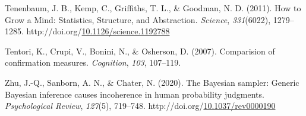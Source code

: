 \documentclass[10pt, letterpaper]{article}
\newenvironment{CSLReferences}%
  {}%
  {\par}
\begin{document}
\begin{CSLReferences}
\leavevmode{}%
Tenenbaum, J. B., Kemp, C., Griffiths, T. L., \& Goodman, N. D. (2011).
How to {Grow} a {Mind}: {Statistics}, {Structure}, and {Abstraction}.
\emph{Science}, \emph{331}(6022), 1279--1285.
http://doi.org/\href{https://doi.org/10.1126/science.1192788}{10.1126/science.1192788}

\leavevmode{}%
Tentori, K., Crupi, V., Bonini, N., \& Osherson, D. (2007). Comparision
of confirmation measures. \emph{Cognition}, \emph{103}, 107--119.

\leavevmode{}%
Zhu, J.-Q., Sanborn, A. N., \& Chater, N. (2020). The {Bayesian}
sampler: {Generic} {Bayesian} inference causes incoherence in human
probability judgments. \emph{Psychological Review}, \emph{127}(5),
719--748.
http://doi.org/\href{https://doi.org/10.1037/rev0000190}{10.1037/rev0000190}

\end{CSLReferences}


\end{document}
